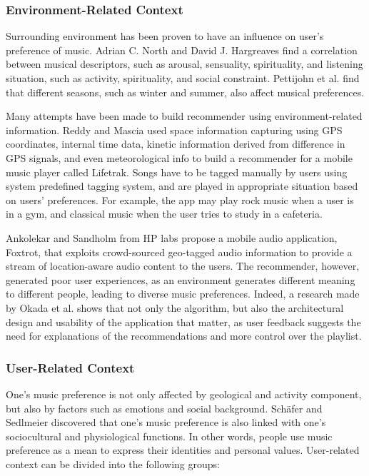 \subsubsection{Environment-Related Context}
Surrounding environment has been proven to have an influence on user's preference of music. Adrian C. North and David J. Hargreaves \cite{north1996situational} find a correlation between musical descriptors, such as arousal, sensuality, spirituality, and listening situation, such as activity, spirituality, and social constraint. Pettijohn et al. \cite{pettijohn2010music} find that different seasons, such as winter and summer, also affect musical preferences. 

Many attempts have been made to build recommender using environment-related information. Reddy and Mascia \cite{reddy2006lifetrak} used space information capturing using GPS coordinates, internal time data, kinetic information derived from difference in GPS signals, and even meteorological info to build a recommender for a mobile music player called Lifetrak. Songs have to be tagged manually by users using system predefined tagging system, and are played in appropriate situation based on users' preferences. For example, the app may play rock music when a user is in a gym, and classical music when the user tries to study in a cafeteria. 

Ankolekar and Sandholm from HP labs \cite{ankolekar2011foxtrot} propose a mobile audio application, Foxtrot, that exploits crowd-sourced geo-tagged audio information to provide a stream of location-aware audio content to the users. The recommender, however, generated poor user experiences, as an environment generates different meaning to different people, leading to diverse music preferences. Indeed, a research made by Okada et al. \cite{okada2013contextplayer} shows that not only the algorithm, but also the architectural design and usability of the application that matter, as user feedback suggests the need for explanations of the recommendations and more control over the playlist. 

\subsubsection{User-Related Context}
One's music preference is not only affected by geological and activity component, but also by factors such as emotions and social background. Sch{\"a}fer and Sedlmeier \cite{schafer2009functions} discovered that one's music preference is also linked with one's sociocultural and physiological functions. In other words, people use music preference as a mean to express their identities and personal values. User-related context can be divided into the following groups:

